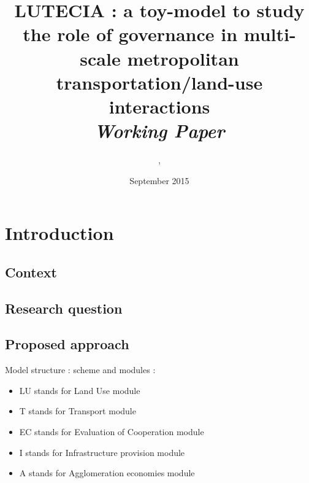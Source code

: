 



\title{LUTECIA : a toy-model to study the role of governance in multi-scale metropolitan transportation/land-use interactions\bigskip\\
\textit{Working Paper}
}
\author{, }
\date{September 2015}




\maketitle

\justify


\begin{abstract}

\end{abstract}


\section{Introduction}


\subsection{Context}



\subsection{Research question}






\subsection{Proposed approach}


Model structure : scheme and modules :

\begin{itemize}
\item LU stands for Land Use module
\item T stands for Transport module
\item EC stands for Evaluation of Cooperation module
\item I stands for Infrastructure provision module
\item A stands for Agglomeration economies module
\end{itemize}


